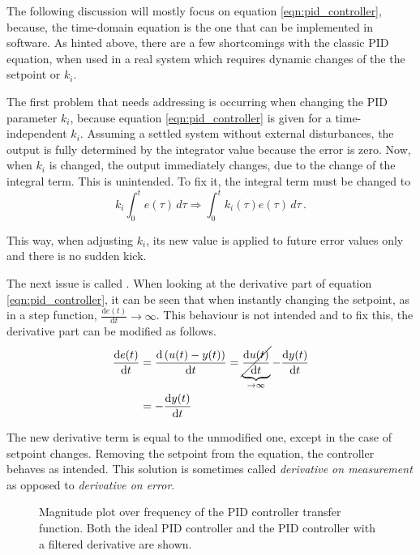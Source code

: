 The following discussion will mostly focus on equation \ref{eqn:pid_controller}, because, the time-domain equation is the one that can be implemented in software. As hinted above, there are a few shortcomings with the classic PID equation, when used in a real system which requires dynamic changes of the the setpoint or $k_i$.

The first problem that needs addressing is occurring when changing the PID parameter $k_i$, because equation \ref{eqn:pid_controller} is given for a time-independent $k_i$. Assuming a settled system without external disturbances, the output is fully determined by the integrator value because the error is zero. Now, when $k_i$ is changed, the output immediately changes, due to the change of the integral term. This is unintended. To fix it, the integral term must be changed to
\begin{equation}
    k_i \int_0^t e(\tau) \,d\tau \Rightarrow \int_0^t k_i(\tau) e(\tau) \,d\tau \,.
\end{equation}

This way, when adjusting $k_i$, its new value is applied to future error values only and there is no sudden kick.

The next issue is called . When looking at the derivative part of equation \ref{eqn:pid_controller}, it can be seen that when instantly changing the setpoint, as in a step function, $\frac{\mathrm{d}e(t)}{\mathrm{d}t} \to \infty$. This behaviour is not intended and to fix this, the derivative part can be modified as follows.
\begin{align}
    \frac{\mathrm{d}e(t)}{\mathrm{d}t} &= \frac{\mathrm{d}\left(u(t) - y(t)\right)}{\mathrm{d}t} = \underbrace{\cancel{\frac{\mathrm{d}u(t)}{\mathrm{d}t}}}_{\to \infty} - \frac{\mathrm{d}y(t)}{\mathrm{d}t} \nonumber\\
    &=- \frac{\mathrm{d}y(t)}{\mathrm{d}t}
\end{align}

The new derivative term is equal to the unmodified one, except in the case of setpoint changes. Removing the setpoint from the equation, the controller behaves as intended. This solution is sometimes called \textit{derivative on measurement} as opposed to \textit{derivative on error}.
\begin{figure}[hb]
    \centering
    \caption{Magnitude plot over frequency of the PID controller transfer function. Both the ideal PID controller and the PID controller with a filtered derivative are shown.}
    \label{fig:sim_pid_controller}
\end{figure}

